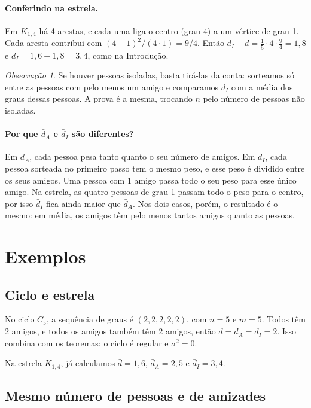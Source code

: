 \documentclass[12pt,a4paper]{article}
\theoremstyle{plain}
\theoremstyle{definition}
\theoremstyle{remark}
\newtheorem{observacao}{Observação}
\newcommand{\dm}{\bar d}          %
\newcommand{\dA}{\bar d_{A}}      %
\newcommand{\dI}{\bar d_{I}}      %
\begin{document}
\paragraph{Conferindo na estrela.} Em $K_{1,4}$ há 4 arestas, e cada
uma liga o centro (grau 4) a um vértice de grau 1. Cada aresta contribui
com $(4-1)^2/(4\cdot 1) = 9/4$. Então
$\dI - \dm = \frac{1}{5}\cdot 4\cdot\frac{9}{4} = 1{,}8$ e
$\dI = 1{,}6 + 1{,}8 = 3{,}4$, como na Introdução.

\begin{observacao}
Se houver pessoas isoladas, basta tirá-las da conta: sorteamos só entre
as pessoas com pelo menos um amigo e comparamos $\dI$ com a média dos
graus dessas pessoas. A prova é a mesma, trocando $n$ pelo número de
pessoas não isoladas.
\end{observacao}

\paragraph{Por que $\dA$ e $\dI$ são diferentes?} Em $\dA$, cada pessoa
pesa tanto quanto o seu número de amigos. Em $\dI$, cada pessoa
sorteada no primeiro passo tem o mesmo peso, e esse peso é dividido
entre os seus amigos. Uma pessoa com 1 amigo passa todo o seu peso para
esse único amigo. Na estrela, as quatro pessoas de grau 1 passam todo o
peso para o centro, por isso $\dI$ fica ainda maior que $\dA$. Nos dois
casos, porém, o resultado é o mesmo: em média, os amigos têm pelo menos
tantos amigos quanto as pessoas.

\section{Exemplos}\label{sec:exemplos}

\subsection{Ciclo e estrela}

No ciclo $C_5$, a sequência de graus é $(2,2,2,2,2)$, com $n=5$ e
$m=5$. Todos têm 2 amigos, e todos os amigos também têm 2 amigos, então
$\dm = \dA = \dI = 2$. Isso combina com os teoremas: o ciclo é regular e
$\sigma^2=0$.

Na estrela $K_{1,4}$, já calculamos $\dm = 1{,}6$, $\dA = 2{,}5$ e
$\dI = 3{,}4$.

\subsection{Mesmo número de pessoas e de amizades}
\end{document}
